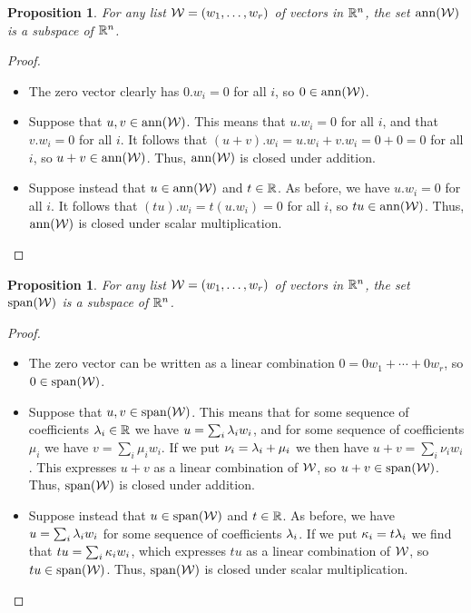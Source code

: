 \documentclass[reqno]{amsart}
\newtheorem{proposition}[theorem]{Proposition}
\theoremstyle{definition}
\begin{document}
\begin{proposition}\label{prop-ann-subspace}
 For any list $\mathcal{W}=(w_1,\dotsc,w_r)$ of vectors in ${\mathbb{R}}^n$, the set
 $\operatorname{ann}(\mathcal{W})$ is a subspace of ${\mathbb{R}}^n$.
\end{proposition}
\begin{proof}
 \begin{itemize}
  \item[(a)] The zero vector clearly has $0.w_i=0$ for all $i$, so
   $0\in\operatorname{ann}(\mathcal{W})$.
  \item[(b)] Suppose that $u,v\in\operatorname{ann}(\mathcal{W})$.  This means that
   $u.w_i=0$ for all $i$, and that $v.w_i=0$ for all $i$.  It follows
   that $(u+v).w_i=u.w_i+v.w_i=0+0=0$ for all $i$, so
   $u+v\in\operatorname{ann}(\mathcal{W})$.  Thus, $\operatorname{ann}(\mathcal{W})$ is closed under addition.
  \item[(c)] Suppose instead that $u\in\operatorname{ann}(\mathcal{W})$ and $t\in{\mathbb{R}}$.  As
   before, we have $u.w_i=0$ for all $i$.  It follows that
   $(tu).w_i=t(u.w_i)=0$ for all $i$, so $tu\in\operatorname{ann}(\mathcal{W})$.  Thus,
   $\operatorname{ann}(\mathcal{W})$ is closed under scalar multiplication.
   \qedhere
 \end{itemize}
\end{proof}

\begin{proposition}\label{prop-span-subspace}
 For any list $\mathcal{W}=(w_1,\dotsc,w_r)$ of vectors in ${\mathbb{R}}^n$, the set
 $\operatorname{span}(\mathcal{W})$ is a subspace of ${\mathbb{R}}^n$.
\end{proposition}
\begin{proof}
 \begin{itemize}
  \item[(a)] The zero vector can be written as a linear combination
   $0=0w_1+\dotsb+0w_r$, so $0\in\operatorname{span}(\mathcal{W})$.
  \item[(b)] Suppose that $u,v\in\operatorname{span}(\mathcal{W})$.  This means that for some
   sequence of coefficients $\lambda_i\in{\mathbb{R}}$ we have $u=\sum_i\lambda_iw_i$,
   and for some sequence of coefficients $\mu_i$ we have
   $v=\sum_i\mu_iw_i$.  If we put $\nu_i=\lambda_i+\mu_i$ we then have
   $u+v=\sum_i\nu_iw_i$.  This expresses $u+v$ as a linear combination
   of $\mathcal{W}$, so $u+v\in\operatorname{span}(\mathcal{W})$.  Thus, $\operatorname{span}(\mathcal{W})$ is closed under
   addition.
  \item[(c)] Suppose instead that $u\in\operatorname{span}(\mathcal{W})$ and $t\in{\mathbb{R}}$.  As
   before, we have $u=\sum_i\lambda_iw_i$ for some sequence of
   coefficients $\lambda_i$.  If we put $\kappa_i=t\lambda_i$ we find that
   $tu=\sum_i\kappa_iw_i$, which expresses $tu$ as a linear combination of
   $\mathcal{W}$, so $tu\in\operatorname{span}(\mathcal{W})$.  Thus, $\operatorname{span}(\mathcal{W})$ is closed under
   scalar multiplication.
   \qedhere
 \end{itemize}
\end{proof}
\end{document}
